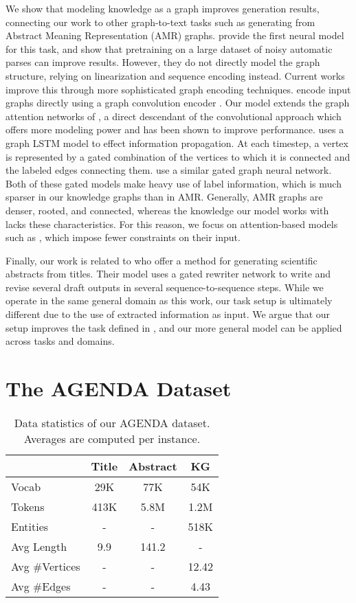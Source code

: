 \documentclass[11pt,a4paper]{article}
\begin{document}
We show that modeling knowledge as a graph improves generation results, connecting our work to other graph-to-text tasks such as generating from Abstract Meaning Representation (AMR) graphs.
\citet{Konstas2017NeuralAS} provide the first neural model for this task, and show that pretraining on a large dataset of noisy automatic parses can improve results.
However, they do not directly model the graph structure, relying on linearization and sequence encoding instead.
Current works improve this through more sophisticated graph encoding techniques. 
\citet{marcheggiani2018deep} encode input graphs directly using a graph convolution encoder \cite{Kipf2016SemiSupervisedCW}.
Our model extends the graph attention networks of \citet{velickovic2017graph}, a direct descendant of the convolutional approach which offers more modeling power and has been shown to improve performance.
\citet{Song2018AGM} uses a graph LSTM model to effect information propagation. 
At each timestep, a vertex is represented by a gated combination of the vertices to which it is connected and the labeled edges connecting them. 
\citet{beck2018graph} use a similar gated graph neural network. 
Both of these gated models make heavy use of label information, which is much sparser in our knowledge graphs than in AMR. 
Generally, AMR graphs are denser, rooted, and connected, whereas the knowledge our model works with lacks these characteristics. 
For this reason, we focus on attention-based models such as \citet{velickovic2017graph}, which impose fewer constraints on their input. 


Finally, our work is related to \citet{wang2018paper} who offer a method for generating scientific abstracts from titles. 
Their model uses a gated rewriter network to write and revise several draft outputs in several sequence-to-sequence steps.
While we operate in the same general domain as this work, our task setup is ultimately different due to the use of extracted information as input.
We argue that our setup improves the task defined in \citet{wang2018paper}, and our more general model can be applied across tasks and domains. 

\section{The AGENDA Dataset}
\begin{table}[t]
\begin{center}
    \begin{tabular}{lccc}
         & Title & Abstract & KG  \\ \hline
        Vocab & 29K  & 77K  & 54K  \\
        Tokens & 413K  & 5.8M & 1.2M \\
        Entities & - & - & 518K \\ 
        Avg Length & 9.9  & 141.2  & -  \\
        Avg \#Vertices & - & - & 12.42 \\
        Avg \#Edges &  - & - & 4.43 
\end{tabular}
    \caption{Data statistics of our AGENDA dataset. Averages are computed per instance. }
    \label{tab:stats}
    \end{center}
\end{table}
\end{document}

